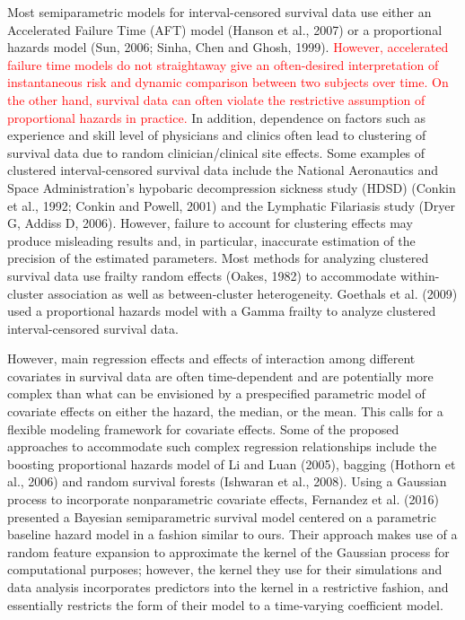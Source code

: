 \documentclass[11pt]{article}
\begin{document}
 Most semiparametric models for interval-censored survival data use either an Accelerated Failure Time (AFT) model (Hanson et al., 2007) or a proportional hazards model (Sun, 2006; Sinha, Chen and Ghosh, 1999). \textcolor{red}{However, accelerated failure time models do not straightaway give an often-desired interpretation of instantaneous risk and dynamic comparison between two subjects over time. On the other hand, survival data can often violate the restrictive assumption of proportional hazards in practice.} In addition, dependence on factors such as experience and skill level of physicians and clinics often lead to clustering of survival data due to random clinician/clinical site effects. Some examples of clustered interval-censored survival data include the National Aeronautics and Space Administration's hypobaric decompression sickness study (HDSD) (Conkin et al., 1992; Conkin and Powell, 2001) and the Lymphatic Filariasis study (Dryer G, Addiss D, 2006). However, failure to account for clustering effects may produce misleading results and, in particular, inaccurate estimation of the precision of the estimated parameters. Most methods for analyzing clustered survival data use frailty random effects (Oakes, 1982) to accommodate within-cluster association as well as between-cluster heterogeneity. Goethals et al. (2009) used a proportional hazards model with a Gamma frailty to analyze clustered interval-censored survival data.
 
 
However, main regression effects and effects of interaction among different covariates in survival data are often time-dependent and are potentially more complex than what can be envisioned by a prespecified parametric model of covariate effects on either the hazard, the median, or the mean. This calls for a flexible modeling framework for covariate effects. Some of the proposed approaches to accommodate such complex regression relationships include the boosting proportional hazards model of Li and Luan (2005), bagging (Hothorn et al., 2006) and random survival forests (Ishwaran et al., 2008). Using a Gaussian process to incorporate nonparametric covariate effects, Fernandez et al. (2016) presented a Bayesian semiparametric survival model centered on a parametric baseline hazard model in a fashion similar to ours. 
\color{red}
Their approach makes use of a random feature expansion to approximate the kernel of the Gaussian process for computational purposes; however, the kernel they use for their simulations and data analysis incorporates predictors into the kernel in a restrictive fashion, and essentially restricts the form of their model to a time-varying coefficient model.
\normalcolor
\end{document}

